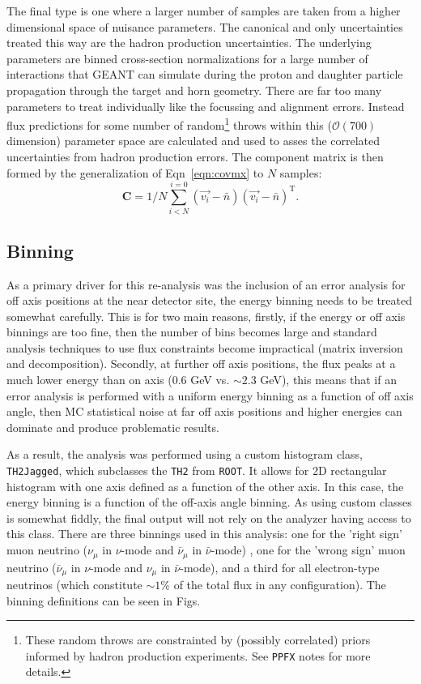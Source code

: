 \documentclass{article}
\begin{document}
The final type is one where a larger number of samples are taken from a higher dimensional space of nuisance parameters. The canonical and only uncertainties treated this way are the hadron production uncertainties. The underlying parameters are binned cross-section normalizations for a large number of interactions that GEANT can simulate during the proton and daughter particle propagation through the target and horn geometry. There are far too many parameters to treat individually like the focussing and alignment errors. Instead flux predictions for some number of random\footnote{These random throws are constrainted by (possibly correlated) priors informed by hadron production experiments. See \texttt{PPFX} notes\cite{} for more details.} throws within this ($\mathcal{O}\left(700\right)$ dimension) parameter space are calculated and used to asses the correlated uncertainties from hadron production errors. The component matrix is then formed by the generalization of Eqn~\ref{eqn:covmx} to $N$ samples:
\[\mathbf{C} = 1/N\sum^{i=0}_{i<N} \left(\vec{v_{i}}-\bar{n}\right)\left(\vec{v_{i}}-\bar{n}\right)^{\mathrm{T}}\label{eqn:covmxN}.\]

\subsection{Binning}

As a primary driver for this re-analysis was the inclusion of an error analysis for off axis positions at the near detector site, the energy binning needs to be treated somewhat carefully. This is for two main reasons, firstly, if the energy or off axis binnings are too fine, then the number of bins becomes large and standard analysis techniques to use flux constraints become impractical (matrix inversion and decomposition). Secondly, at further off axis positions, the flux peaks at a much lower energy than on axis ($0.6$ GeV vs. $\sim 2.3$ GeV), this means that if an error analysis is performed with a uniform energy binning as a function of off axis angle, then MC statistical noise at far off axis positions and higher energies can dominate and produce problematic results.

As a result, the analysis was performed using a custom histogram class, \texttt{TH2Jagged}, which subclasses the \texttt{TH2} from \texttt{ROOT}. It allows for 2D rectangular histogram with one axis defined as a function of the other axis. In this case, the energy binning is a function of the off-axis angle binning. As using custom classes is somewhat fiddly, the final output will not rely on the analyzer having access to this class. There are three binnings used in this analysis: one for the 'right sign' muon neutrino ($\nu_{\mu}$ in $\nu$-mode and $\bar{\nu}_{\mu}$ in $\bar{\nu}$-mode) , one for the 'wrong sign' muon neutrino ($\bar{\nu}_{\mu}$ in $\nu$-mode and $\nu_{\mu}$ in $\bar{\nu}$-mode), and a third for all electron-type neutrinos (which constitute $\sim 1\% $ of the total flux in any configuration). The binning definitions can be seen in Figs.
\end{document}
